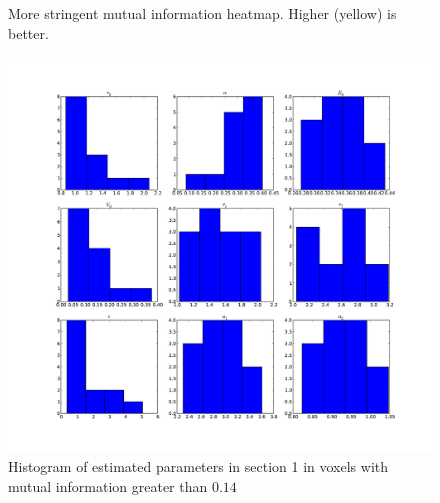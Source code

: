 \begin{figure}
\centering
{}
\caption{More stringent mutual information heatmap. Higher (yellow) is better.}
\label{fig:sim_hm2}
\end{figure}

\begin{figure} %
\centering
\includegraphics[clip=true,trim=2.5cm 2cm 2cm 1cm,width=15cm]{images/slicesim_hist1}
\caption{Histogram of estimated parameters in section 1 in voxels with mutual information greater
than $0.14$}
\label{fig:slicesim_hist1}
\end{figure}

